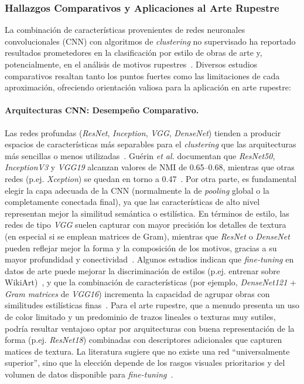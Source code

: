 \subsubsection{Hallazgos Comparativos y Aplicaciones al Arte Rupestre}

La combinación de características provenientes de redes neuronales convolucionales (CNN) con algoritmos de \textit{clustering} no supervisado ha reportado resultados prometedores en la clasificación por estilo de obras de arte y, potencialmente, en el análisis de motivos rupestres~\cite{dangeti2024,castellano2022}.
Diversos estudios comparativos resaltan tanto los puntos fuertes como las limitaciones de cada aproximación, ofreciendo orientación valiosa para la aplicación en arte rupestre:

\paragraph{Arquitecturas CNN: Desempeño Comparativo.}
Las redes profundas (\textit{ResNet}, \textit{Inception}, \textit{VGG}, \textit{DenseNet}) tienden a producir espacios de características más separables para el \textit{clustering} que las arquitecturas más sencillas o menos utilizadas~\cite{guerin2018}.
Guérin \textit{et al.} documentan que \textit{ResNet50}, \textit{InceptionV3} y \textit{VGG19} alcanzan valores de NMI de 0.65–0.68, mientras que otras redes (p.ej. \textit{Xception}) se quedan en torno a 0.47~\cite{guerin2018}.
Por otra parte, es fundamental elegir la capa adecuada de la CNN (normalmente la de \textit{pooling} global o la completamente conectada final), ya que las características de alto nivel representan mejor la similitud semántica o estilística.
En términos de estilo, las redes de tipo \textit{VGG} suelen capturar con mayor precisión los detalles de textura (en especial si se emplean matrices de Gram), mientras que \textit{ResNet} o \textit{DenseNet} pueden reflejar mejor la forma y la composición de los motivos, gracias a su mayor profundidad y conectividad~\cite{gairola2020}.
Algunos estudios indican que \textit{fine-tuning} en datos de arte puede mejorar la discriminación de estilos (p.ej. entrenar sobre WikiArt)~\cite{sanakoyeu2018}, y que la combinación de características (por ejemplo, \textit{DenseNet121} + \textit{Gram matrices} de \textit{VGG16}) incrementa la capacidad de agrupar obras con similitudes estilísticas finas~\cite{dangeti2024}.
Para el arte rupestre, que a menudo presenta un uso de color limitado y un predominio de trazos lineales o texturas muy sutiles, podría resultar ventajoso optar por arquitecturas con buena representación de la forma (p.ej. \textit{ResNet18}) combinadas con descriptores adicionales que capturen matices de textura.
La literatura sugiere que no existe una red “universalmente superior”, sino que la elección depende de los rasgos visuales prioritarios y del volumen de datos disponible para \textit{fine-tuning}~\cite{guerin2018,gairola2020}.

